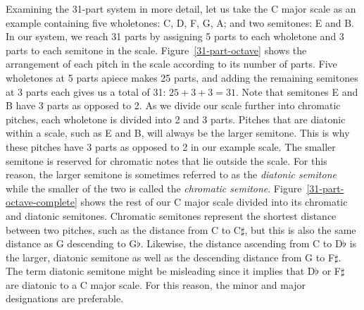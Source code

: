 Examining the 31-part system in more detail, let us take the C major scale as an
example containing five wholetones: C, D, F, G, A; and two semitones: E and B. In our
system, we reach 31 parts by assigning 5 parts to each wholetone and 3 parts to each
semitone in the scale.  Figure~\ref{31-part-octave} shows the arrangement of each pitch
in the scale according to its number of parts. 
Five wholetones at 5 parts apiece makes 25 parts, and adding the remaining semitones at
3 parts each gives us a total of 31: $ 25 + 3 + 3 = 31 $. Note that semitones E and B
have 3 parts as opposed to 2.  As we divide our scale further into chromatic pitches,
each wholetone is divided into 2 and 3 parts.  Pitches that are diatonic within a
scale, such as E and B, will always be the larger semitone.  This is why these pitches
have 3 parts as opposed to 2 in our example scale.  The smaller semitone is reserved
for chromatic notes that lie outside the scale. For this reason, the larger semitone is
sometimes referred to as the \textit{diatonic semitone} while the smaller of the two is
called the \textit{chromatic semitone}. Figure~\ref{31-part-octave-complete} shows the
rest of our C major scale divided into its chromatic and diatonic semitones.
 Chromatic semitones represent the
shortest distance between two pitches, such as the distance from C to C$\sharp$, but
this is also the same distance as G descending to G$\flat$.  Likewise, the distance
ascending from C to D$\flat$ is the larger, diatonic semitone as well as the descending
distance from G to F$\sharp$. The term diatonic semitone might be misleading since it
implies that D$\flat$ or F$\sharp$ are diatonic to a C major scale.  For this reason,
the minor and major designations are preferable.

